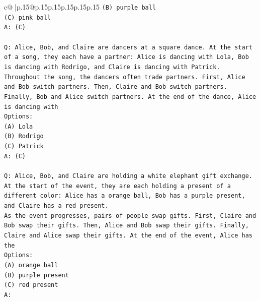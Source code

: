\documentclass{article}
\begin{document}
{\begin{supertabular}{c@{$\;$}|p{.15\linewidth}@{}p{.15\linewidth}p{.15\linewidth}p{.15\linewidth}p{.15\linewidth}p{.15\linewidth}}
{{{\texttt{(B) purple ball} \\
\texttt{(C) pink ball} \\
\texttt{A: (C)} \\
\\ 
\texttt{Q: Alice, Bob, and Claire are dancers at a square dance. At the start of a song, they each have a partner: Alice is dancing with Lola, Bob is dancing with Rodrigo, and Claire is dancing with Patrick.} \\
\texttt{Throughout the song, the dancers often trade partners. First, Alice and Bob switch partners. Then, Claire and Bob switch partners. Finally, Bob and Alice switch partners. At the end of the dance, Alice is dancing with} \\
\texttt{Options:} \\
\texttt{(A) Lola} \\
\texttt{(B) Rodrigo} \\
\texttt{(C) Patrick} \\
\texttt{A: (C)} \\
\\ 
\texttt{Q: Alice, Bob, and Claire are holding a white elephant gift exchange. At the start of the event, they are each holding a present of a different color: Alice has a orange ball, Bob has a purple present, and Claire has a red present.} \\
\texttt{As the event progresses, pairs of people swap gifts. First, Claire and Bob swap their gifts. Then, Alice and Bob swap their gifts. Finally, Claire and Alice swap their gifts. At the end of the event, Alice has the} \\
\texttt{Options:} \\
\texttt{(A) orange ball} \\
\texttt{(B) purple present} \\
\texttt{(C) red present} \\
\texttt{A:} \\
            }
        }
    }
     \\ \\


\end{supertabular}}
\end{document}

